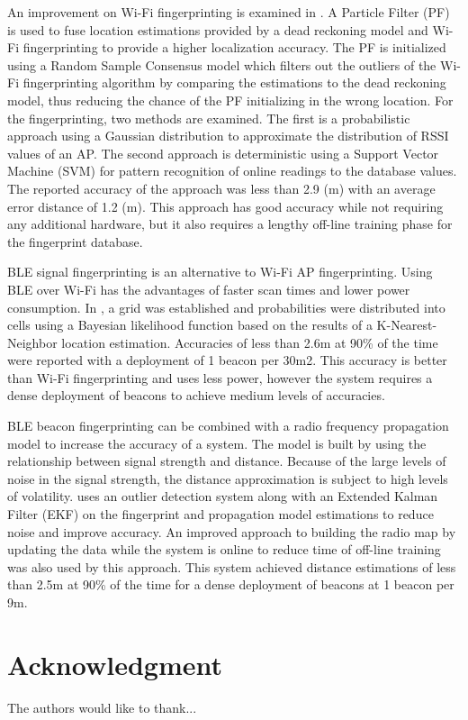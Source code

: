 \documentclass[conference]{IEEEtran}
\begin{document}
An improvement on  Wi-Fi fingerprinting is examined in \cite{wu2016improved}.  A Particle Filter (PF) is used to fuse location estimations provided by a dead reckoning model and Wi-Fi fingerprinting to provide a higher localization accuracy. The PF is initialized using a Random Sample Consensus model which filters out the outliers of the Wi-Fi fingerprinting algorithm by comparing the estimations to the dead reckoning model, thus reducing the chance of the PF initializing in the wrong location. For the fingerprinting, two methods are examined. The first is a probabilistic approach using a Gaussian distribution to approximate the distribution of RSSI values of an AP. The second approach is deterministic using a Support Vector Machine (SVM) for pattern recognition of online readings to the database values.  The reported accuracy of the approach was less than 2.9 (m) with an average error distance of 1.2 (m). This approach has good accuracy while not requiring any additional hardware, but it also requires a lengthy off-line training phase for the fingerprint database.

BLE signal fingerprinting is an alternative to Wi-Fi AP fingerprinting. Using BLE over Wi-Fi has the advantages of faster scan times and lower power consumption. In \cite{faragher2015location}, a grid was established and probabilities were distributed into cells using a Bayesian likelihood function based on the results of a K-Nearest-Neighbor location estimation. Accuracies of less than 2.6m at 90\% of the time were reported with a deployment of 1 beacon per 30m2. This accuracy is better than Wi-Fi fingerprinting and uses less power, however the  system  requires a dense deployment of beacons to achieve medium levels of accuracies.

BLE beacon fingerprinting can be combined with a radio frequency propagation model to increase the accuracy of a system. The model is built by using the relationship between signal strength and distance. Because of the large levels of noise in the signal strength, the distance approximation is subject to high levels of volatility. \cite{zhuang2016smartphone} uses an outlier detection system along with an Extended Kalman Filter (EKF) on the fingerprint and propagation model estimations to reduce noise and improve accuracy. An improved approach to building the radio map by updating the data while the system is online to reduce time of off-line training was also used by this approach. This system achieved distance estimations of less than 2.5m at 90\% of the time for a dense deployment of beacons at 1 beacon per 9m.

\section*{Acknowledgment}


The authors would like to thank...








\end{document}
